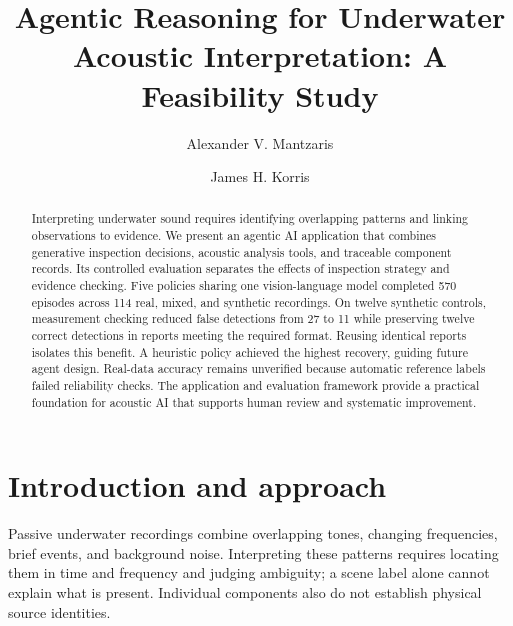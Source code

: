 \documentclass[runningheads,orivec]{llncs}
\begin{document}
\raggedbottom
\renewcommand{\topfraction}{0.9}
\renewcommand{\bottomfraction}{0.9}
\renewcommand{\textfraction}{0.05}
\renewcommand{\floatpagefraction}{0.85}
\title{Agentic Reasoning for Underwater Acoustic Interpretation: A Feasibility Study}
\author{Alexander V. Mantzaris \and James H. Korris}
\maketitle

\begin{abstract}
Interpreting underwater sound requires identifying overlapping patterns and linking observations to evidence. We present an agentic AI application that combines generative inspection decisions, acoustic analysis tools, and traceable component records. Its controlled evaluation separates the effects of inspection strategy and evidence checking. Five policies sharing one vision-language model completed 570 episodes across 114 real, mixed, and synthetic recordings. On twelve synthetic controls, measurement checking reduced false detections from 27 to 11 while preserving twelve correct detections in reports meeting the required format. Reusing identical reports isolates this benefit. A heuristic policy achieved the highest recovery, guiding future agent design. Real-data accuracy remains unverified because automatic reference labels failed reliability checks. The application and evaluation framework provide a practical foundation for acoustic AI that supports human review and systematic improvement.
\end{abstract}

\section{Introduction and approach}
Passive underwater recordings combine overlapping tones, changing frequencies, brief events, and background noise. Interpreting these patterns requires locating them in time and frequency and judging ambiguity; a scene label alone cannot explain what is present. Individual components also do not establish physical source identities.
\end{document}
